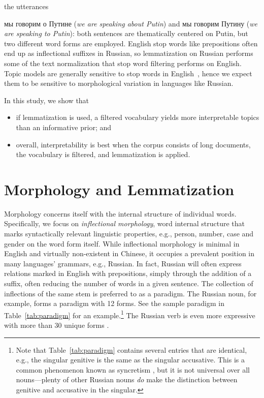 \documentclass[11pt,letterpaper]{article}
\begin{document}
the utterances {{мы говорим о Путине} ({\em we
    are speaking about Putin}) and {{мы
      говорим Путину} ({\em we are speaking to Putin})}: both sentences
  are thematically centered on Putin, but two different word forms
  are employed.
English stop words like prepositions often end up as inflectional
suffixes in Russian, so lemmatization on Russian performs some
of the text normalization that stop word filtering performs on English.
Topic models are generally sensitive to stop
words in English~\cite{wallach2009,blei2010,eisenstein2011}, hence we
expect them to be sensitive to morphological variation in languages
like Russian.

In this study, we show that
\begin{itemize}
    \item if lemmatization is used, a filtered vocabulary yields more
        interpretable topics than an informative prior; and
    \item overall, interpretability is best when the corpus consists
        of long documents, the vocabulary is filtered, and lemmatization
        is applied.
\end{itemize}


\section{Morphology and Lemmatization}\label{sec:inflectional}

Morphology concerns itself with the internal structure of individual
words.  Specifically, we focus on {\em inflectional morphology}, word
internal structure that marks syntactically relevant linguistic
properties, e.g., person, number, case and gender on the word form
itself. While inflectional morphology is minimal in English and
virtually non-existent in Chinese, it occupies a prevalent position in
many languages' grammars, e.g., Russian. In fact, Russian will often
express relations marked in English with prepositions, simply through
the addition of a suffix, often reducing the number of words in a
given sentence. The collection of inflections of the same stem is preferred to as a
paradigm.  The Russian noun, for example, forms a paradigm with 12
forms.  See the sample paradigm in Table~\ref{tab:paradigm} for an
example.\footnote{
    Note that Table~\ref{tab:paradigm} contains several
  entries that are identical, e.g., the singular genitive is the same
  as the singular accusative. This is a common phenomenon known as
  syncretism \cite{baerman2005syntax}, but it is not universal over all nouns---plenty of other
  Russian nouns {\em do} make the distinction between
  genitive and accusative in the singular.
}
The Russian verb is even more expressive with more
than 30 unique forms \cite{wade2010comprehensive}.

}
\end{document}
